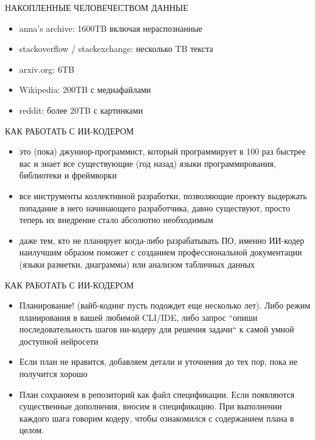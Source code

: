 \documentclass[aspectratio=169]{beamer}
\begin{document}
{		\begin{frame}{НАКОПЛЕННЫЕ ЧЕЛОВЕЧЕСТВОМ ДАННЫЕ}
		
		\begin{itemize}
			\item [-] anna’s archive: 1600TB включая нераспознанные
			\item [-] stackoverflow / stackexchange: несколько TB текста
			\item [-] arxiv.org: 6TB
			\item [-] Wikipedia: 200TB с медиафайлами
			\item [-] reddit: более 20TB с картинками
			
		\end{itemize}		
		
	\end{frame}

    \begin{frame}{КАК РАБОТАТЬ С ИИ-КОДЕРОМ}
	\begin{itemize}
		\item [-] это (пока) джуниор-программист, который программирует в 100 раз быстрее вас и знает все существующие (год назад) языки программирования, библиотеки и фреймворки
		\item [-] все инструменты коллективной разработки, позволяющие проекту выдержать попадание в него начинающего разработчика, давно существуют, просто теперь их внедрение стало абсолютно необходимым
		\item [-] даже тем, кто не планирует когда-либо разрабатывать ПО, именно ИИ-кодер наилучшим образом поможет с созданием профессиональной документации (языки разметки, диаграммы) или анализом табличных данных
	\end{itemize}
    \end{frame}	
    
    
    \begin{frame}{КАК РАБОТАТЬ С ИИ-КОДЕРОМ}
    	\begin{itemize}
    		\item [-] Планирование! (вайб-кодинг пусть подождет еще несколько лет). Либо режим планирования в вашей любимой CLI/IDE, либо запрос ``опиши последовательность шагов ии-кодеру для решения задачи`` к самой умной доступной нейросети
    		\item [-] Если план не нравится, добавляем детали и уточнения до тех пор, пока не получится хорошо
    		\item [-] План сохраняем в репозиторий как файл спецификации. Если появляются существенные дополнения, вносим в спецификацию. При выполнении каждого шага говорим кодеру, чтобы ознакомился с содержанием плана в целом.     	
    	\end{itemize}
    \end{frame}	

}
\end{document}
